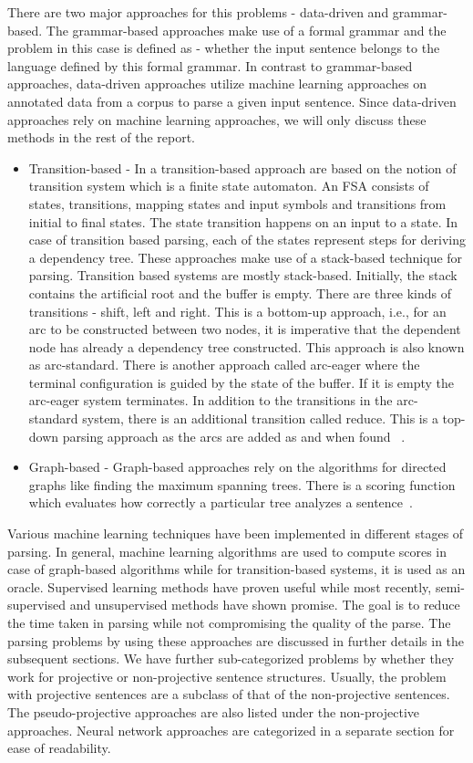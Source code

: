 There are two major approaches for this problems - data-driven and grammar-based. The grammar-based approaches make use of a formal grammar and the problem in this case is defined as - whether the input sentence belongs to the language defined by this formal grammar. In contrast to grammar-based approaches, data-driven approaches utilize machine learning approaches on annotated data from a corpus to parse a given input sentence. Since data-driven approaches rely on machine learning approaches, we will only discuss these methods in the rest of the report.

\begin{itemize}
    \item{Transition-based - }{In a transition-based approach are based on the notion of transition system which is a finite state automaton. An FSA consists of states, transitions, mapping states and input symbols and transitions from initial to final states. The state transition happens on an input to a state. In case of transition based parsing, each of the states represent steps for deriving a dependency tree. These approaches make use of a stack-based technique for parsing. Transition based systems are mostly stack-based. Initially, the stack contains the artificial root and the buffer is empty. There are three kinds of transitions - shift, left and right. This is a bottom-up approach, i.e., for an arc to be constructed between two nodes, it is imperative that the dependent node has already a dependency tree constructed. This approach is also known as arc-standard. There is another approach called arc-eager where the terminal configuration is guided by the state of the buffer. If it is empty the arc-eager system terminates. In addition to the transitions in the arc-standard system, there is an additional transition called reduce. This is a top-down parsing approach as the arcs are added as and when found~ \cite{kubler2009dependency}.
    }
    \item{Graph-based - }{Graph-based approaches rely on the algorithms for directed graphs like finding the maximum spanning trees. There is a scoring function which evaluates how correctly a particular tree analyzes a sentence~\cite{kubler2009dependency}. }
\end{itemize}
 
Various machine learning techniques have been implemented in different stages of parsing. In general, machine learning algorithms are used to compute scores in case of graph-based algorithms while for transition-based systems, it is used as an oracle. Supervised learning methods have proven useful while most recently, semi-supervised and unsupervised methods have shown promise. The goal is to reduce the time taken in parsing while not compromising the quality of the parse. 
The parsing problems by using these approaches are discussed in further details in the subsequent sections. We have further sub-categorized problems by whether they work for projective or non-projective sentence structures. Usually, the problem with projective sentences are a subclass of that of the non-projective sentences. The pseudo-projective approaches are also listed under the non-projective approaches. Neural network approaches are categorized in a separate section for ease of readability.

